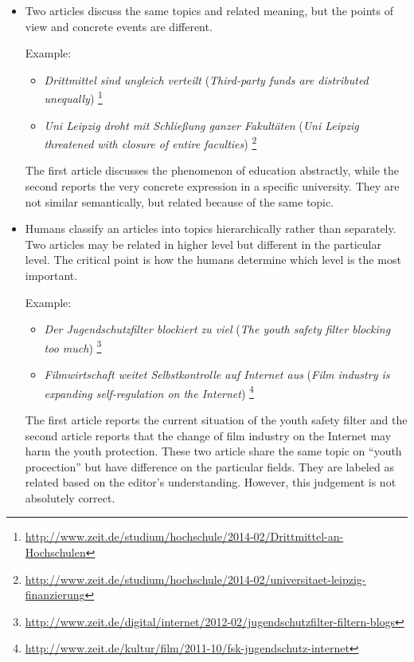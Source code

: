 \begin{itemize}
    \item Two articles discuss the same topics and related meaning, but the points of view and concrete events are different. 
    
    Example:
    \begin{itemize}
    \item \textit{Drittmittel sind ungleich verteilt} (\textit{Third-party funds are distributed unequally}) \footnote{\url{http://www.zeit.de/studium/hochschule/2014-02/Drittmittel-an-Hochschulen}}
    \item \textit{Uni Leipzig droht mit Schlie\ss{}ung ganzer Fakult\"aten} (\textit{Uni Leipzig threatened with closure of entire faculties}) \footnote{\url{http://www.zeit.de/studium/hochschule/2014-02/universitaet-leipzig-finanzierung}}
    \end{itemize}
    The first article discusses the phenomenon of education abstractly, while the second reports the very concrete expression in a specific university. They are not similar semantically, but related because of the same topic.
    
    
    \item Humans classify an articles into topics hierarchically rather than separately. Two articles may be related in higher level but different in the particular level. The critical point is how the humans determine which level is the most important. 
    
    Example:
    \begin{itemize}
        \item \textit{Der Jugendschutzfilter blockiert zu viel} (\textit{The youth safety filter blocking too much}) \footnote{\url{http://www.zeit.de/digital/internet/2012-02/jugendschutzfilter-filtern-blogs}}
        \item \textit{Filmwirtschaft weitet Selbstkontrolle auf Internet aus} (\textit{Film industry is expanding self-regulation on the Internet}) \footnote{\url{http://www.zeit.de/kultur/film/2011-10/fsk-jugendschutz-internet}}
    \end{itemize}    
    
    The first article reports the current situation of the youth safety filter and the second article reports that the change of film industry on the Internet may harm the youth protection. These two article share the same topic on ``youth procection'' but have difference on the particular fields. They are labeled as related based on the editor's understanding. However, this judgement is not absolutely correct. 
    
\end{itemize}


